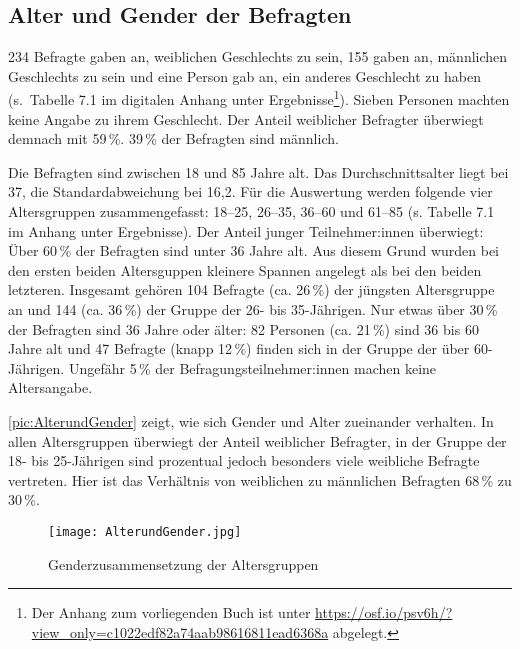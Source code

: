 \subsection{Alter und Gender der Befragten}
\label{sec:AlterundGender}
234 Befragte gaben an, weiblichen Geschlechts zu sein, 155 gaben an, männlichen Geschlechts zu sein und eine Person gab an, ein anderes Geschlecht zu haben (s.~Tabelle 7.1 im digitalen Anhang unter Ergebnisse\footnote{Der Anhang zum vorliegenden Buch ist unter \url{https://osf.io/psv6h/?view_only=c1022edf82a74aab98616811ead6368a} abgelegt.}). 
Sieben Personen machten keine Angabe zu ihrem Geschlecht. 
Der Anteil weiblicher Befragter überwiegt demnach mit 59\,\%. 39\,\% der Befragten sind männlich. 

Die Befragten sind zwischen 18 und 85 Jahre alt. 
Das Durchschnittsalter liegt bei 37, die Standardabweichung bei 16,2. 
Für die Auswertung werden folgende vier Altersgruppen zusammengefasst: 18--25, 26--35, 36--60 und 61--85 (s. Tabelle 7.1 im Anhang unter Ergebnisse).
Der Anteil junger Teilnehmer:innen überwiegt: Über 60\,\% der Befragten sind unter 36 Jahre alt.
Aus diesem Grund wurden bei den ersten beiden Altersguppen kleinere Spannen angelegt als bei den beiden letzteren. 
Insgesamt gehören 104 Befragte (ca. 26\,\%) der jüngsten Altersgruppe an und 144 (ca. 36\,\%) der Gruppe der 26- bis 35-Jährigen.
Nur etwas über 30\,\% der Befragten sind 36 Jahre oder älter:
82 Personen (ca. 21\,\%) sind 36 bis 60 Jahre alt und 47 Befragte (knapp 12\,\%) finden sich in der Gruppe der über 60-Jährigen. 
Ungefähr 5\,\% der Befragungsteilnehmer:innen machen keine Altersangabe.

\autoref{pic:AlterundGender} zeigt, wie sich Gender und Alter zueinander verhalten. 
In allen Altersgruppen überwiegt der Anteil weiblicher Befragter, in der Gruppe der 18- bis 25-Jährigen sind prozentual jedoch besonders viele weibliche Befragte vertreten. 
Hier ist das Verhältnis von weiblichen zu männlichen Befragten 68\,\% zu 30\,\%.\largerpage

\begin{figure}[H]
\texttt{[image: AlterundGender.jpg]}
\caption{Genderzusammensetzung der Altersgruppen}
\label{pic:AlterundGender}
\end{figure}

